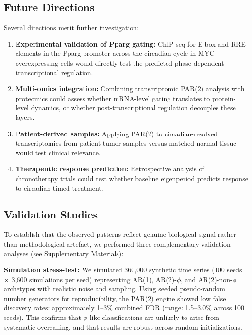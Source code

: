 \documentclass[11pt,a4paper]{article}
\begin{document}
\subsection{Future Directions}

Several directions merit further investigation:

\begin{enumerate}
    \item \textbf{Experimental validation of Pparg gating:} ChIP-seq for E-box and RRE elements in the Pparg promoter across the circadian cycle in MYC-overexpressing cells would directly test the predicted phase-dependent transcriptional regulation.
    
    \item \textbf{Multi-omics integration:} Combining transcriptomic PAR(2) analysis with proteomics could assess whether mRNA-level gating translates to protein-level dynamics, or whether post-transcriptional regulation decouples these layers.
    
    \item \textbf{Patient-derived samples:} Applying PAR(2) to circadian-resolved transcriptomics from patient tumor samples versus matched normal tissue would test clinical relevance.
    
    \item \textbf{Therapeutic response prediction:} Retrospective analysis of chronotherapy trials could test whether baseline eigenperiod predicts response to circadian-timed treatment.
\end{enumerate}

\subsection{Validation Studies}

To establish that the observed patterns reflect genuine biological signal rather than methodological artefact, we performed three complementary validation analyses (see Supplementary Materials):

\textbf{Simulation stress-test:} We simulated 360,000 synthetic time series (100 seeds $\times$ 3,600 simulations per seed) representing AR(1), AR(2)-$\phi$, and AR(2)-non-$\phi$ archetypes with realistic noise and sampling. Using seeded pseudo-random number generators for reproducibility, the PAR(2) engine showed low false discovery rates: approximately 1--3\% combined FDR (range: 1.5--3.0\% across 100 seeds). This confirms that $\phi$-like classifications are unlikely to arise from systematic overcalling, and that results are robust across random initializations.
\end{document}
